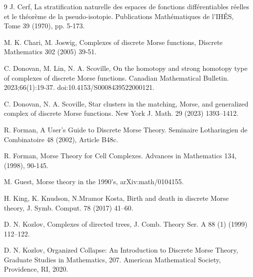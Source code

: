 \documentclass[a4paper,12pt,notitlepage]{amsart}
\theoremstyle{definition}%
\theoremstyle{definition}%
\theoremstyle{definition}%
\begin{document}
\begin{thebibliography}{9}
J. Cerf,
 La stratification naturelle des espaces de fonctions différentiables réelles et le théorème de la pseudo-isotopie. Publications Mathématiques de l'IHÉS, Tome 39 (1970), pp. 5-173. 

M. K. Chari,  M.  Joswig, 
Complexes of discrete Morse functions,
Discrete Mathematics 302 (2005) 39-51.

C. Donovan,  M. Lin,  N. A. Scoville,
On the homotopy and strong homotopy type of complexes of discrete Morse functions. 
Canadian Mathematical Bulletin. 2023;66(1):19-37. doi:10.4153/S0008439522000121.

C. Donovan, N. A. Scoville,
Star clusters in the matching, Morse, and generalized complex of discrete Morse functions.
New York J. Math. 29 (2023) 1393–1412.


R. Forman,
A User's Guide to Discrete Morse Theory.
Seminaire Lotharingien de Combinatoire 48 (2002), Article B48c.

R. Forman,
Morse Theory for Cell Complexes.
Advances in Mathematics 134, (1998), 90-145.


M. Guest, 
Morse theory in the 1990's,
arXiv:math/0104155.



H. King, 
K. Knudson, 
N.Mramor Kosta, 
Birth and death in discrete Morse theory, J. Symb. Comput. 78 (2017) 41–60.

D. N.  Kozlov, 
Complexes of directed trees, 
J. Comb. Theory Ser. A 88 (1) (1999) 112–122.



D. N.  Kozlov,
Organized Collapse: An Introduction to 
Discrete Morse Theory,
Graduate Studies in Mathematics, 207.
American Mathematical Society, Providence, RI, 2020.



\end{thebibliography}
\end{document}
